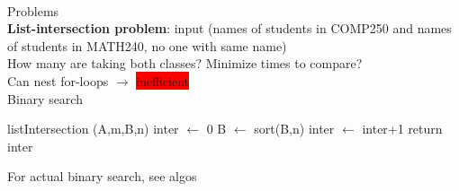 ~\\\color{Black}
Problems
\\ \textbf{List-intersection problem}: input (names of students in COMP250 and names of students in MATH240, no one with same name)
\\ How many are taking both classes? Minimize times to compare?
\\ Can nest for-loops $\to$ \colorbox{Red}{inefficient}
\\ Binary search
\begin{algorithmic}
	\State listIntersection (A,m,B,n)
	\State inter $\gets$ 0
	\State B $\gets$ sort(B,n)
			\State inter $\gets$ inter+1
			\EndIf
	\EndFor
	\State return inter
\end{algorithmic}
For actual binary search, see algos